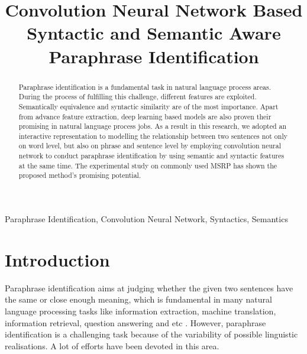 \documentclass[conference]{IEEEtran}
\begin{document}
\title{Convolution Neural Network Based Syntactic and Semantic Aware Paraphrase Identification}

\author{
{}
}

\maketitle

\begin{abstract}
Paraphrase identification is a fundamental task in natural language process areas. During the process of fulfilling this challenge, different features are exploited. Semantically equivalence and syntactic similarity are of the most importance. Apart from advance feature extraction, deep learning based models are also proven their promising in natural language process jobs. As a result in this research, we adopted an interactive representation to modelling the relationship between two sentences not only on word level, but also on phrase and sentence level by employing convolution neural network to conduct paraphrase identification by using semantic and syntactic features at the same time. The experimental study on commonly used MSRP has shown the proposed method's promising potential.
\end{abstract}

\begin{IEEEkeywords}
Paraphrase Identification, Convolution Neural Network, Syntactics, Semantics
\end{IEEEkeywords}

\section{Introduction}

Paraphrase identification aims at judging whether the given two sentences have the same or close enough meaning, which is fundamental in many natural language processing tasks like information extraction, machine translation, information retrieval, question answering and etc \cite{DBLP:conf/naacl/YinS15}. However, paraphrase identification is a challenging task because of the variability of possible linguistic realisations. A lot of efforts have been devoted in this area.
\end{document}
